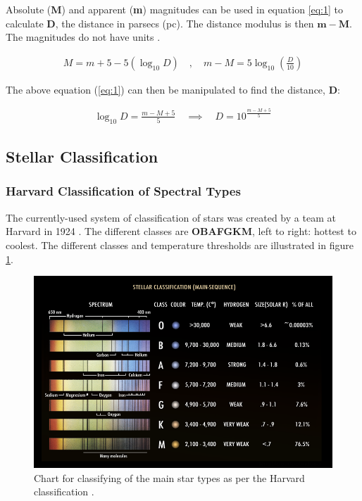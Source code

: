 \documentclass[12pt]{article}
\begin{document}
Absolute (\textbf{M}) and apparent (\textbf{m}) magnitudes can be used in equation \ref{eq:1} to calculate \textbf{D}, the distance in parsecs (pc).
The distance modulus is then $\mathbf{m - M}$.  The magnitudes do not have units
\cite{cosmosabsmag}.

\vspace{-1.5ex}
\begin{gather} \label{eq:1}
    M = m + 5 - 5 (\log_{10} D) \quad , \quad m - M = 5 \log_{10} \left( \frac{D}{10} \right)
\end{gather}

The above equation (\ref{eq:1}) can then be manipulated to find the distance, \textbf{D}:

\vspace{-1.5ex}
\begin{gather} \label{eq:2}
    \log_{10}D = \frac{m - M + 5}{5} \quad \implies \quad D = 10^{\frac{m - M + 5}{5}}
\end{gather}

\vspace{1.5cm}
\subsection{Stellar Classification}

\subsubsection{Harvard Classification of Spectral Types} \label{sec:1.2.1}

The currently-used system of classification of stars was created by a team at Harvard in 1924 \cite{harvardstar}. The different classes are \textbf{OBAFGKM}, left to right: hottest to coolest.
The different classes and temperature thresholds are illustrated in figure \ref{fig:starclassy}.

\begin{figure}[H]
    \centering
    \includegraphics[width=.8\textwidth]{Stellar_Classification_Chart.png}
    \caption{\centering Chart for classifying of the main star types as per the Harvard classification \protect\cite{wikistar}.}
    \label{fig:starclassy}
\end{figure}
\end{document}
